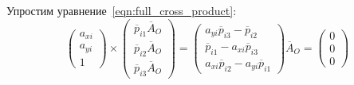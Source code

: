 \documentclass[12pt, a4paper]{article}
\begin{document}
Упростим уравнение~\ref{eqn:full_cross_product}:
\begin{equation}
    \begin{pmatrix}
        a_{xi}\\
        a_{yi}\\
        1
    \end{pmatrix} \times \begin{pmatrix}
        \overline{p}_{i1} \overline{A}_O\\
        \overline{p}_{i2} \overline{A}_O\\
        \overline{p}_{i3} \overline{A}_O
    \end{pmatrix} = \begin{pmatrix}
        a_{yi} \overline{p}_{i3} - \overline{p}_{i2} \\
        \overline{p}_{i1} - a_{xi} \overline{p}_{i3} \\
        a_{xi} \overline{p}_{i2} - a_{yi} \overline{p}_{i1}
    \end{pmatrix} \overline{A}_O = \begin{pmatrix}
        0\\
        0\\
        0
    \end{pmatrix}
\label{eqn:cross_product_one_camera}
\end{equation}
\par
\end{document}
